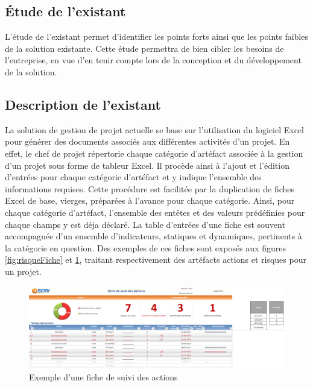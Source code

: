\begin{spacing}{1.5}
\section{Étude de l'existant}
L'étude de l'existant permet d'identifier les points forts ainsi que les points faibles de la solution existante. Cette étude permettra de bien cibler les besoins de l'entreprise, en vue d'en tenir compte lors de la conception et du développement de la solution.
\subsection{Description de l'existant}
La solution de gestion de projet actuelle se base sur l'utilisation du logiciel Excel pour générer des documents associés aux différentes activités d'un projet. En effet, le chef de projet répertorie chaque catégorie d'artéfact associée à la gestion d'un projet sous forme de tableur Excel. Il procède ainsi à l'ajout et l'édition d'entrées pour chaque catégorie d'artéfact et y indique l'ensemble des informations requises. Cette procédure est facilitée par la duplication de fiches Excel de base, vierges, préparées à l'avance pour chaque catégorie. Ainsi, pour chaque catégorie d'artéfact, l'ensemble des entêtes et des valeurs prédéfinies pour chaque champs y est déja déclaré. La table d'entrées d'une fiche est souvent accompagnée d'un ensemble d'indicateurs, statiques et dynamiques, pertinents à la catégorie en question. Des exemples de ces fiches sont exposés aux figures \ref{fig:risqueFiche} et \ref{fig:actionFiche}, traitant respectivement des artéfacts actions et risques pour un projet.

\begin{figure}[H]
\centering
\includegraphics[width=\linewidth]{ficheActions.png}
\caption{Exemple d'une fiche de suivi des actions}
\label{fig:actionFiche}
\end{figure}


\end{spacing}
